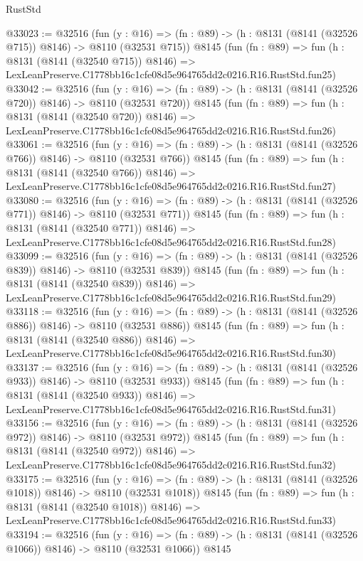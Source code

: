 \begin{lexlean}{RustStd}
\begin{coremodule}
@33023 := @32516
    (fun (y : @16) => (fn : @89) -> (h : @8131 (@8141 (@32526 @715)) @8146) -> @8110 (@32531 @715))
    @8145
    (fun (fn : @89) =>
    fun (h : @8131 (@8141 (@32540 @715)) @8146) =>
    LexLeanPreserve.C1778bb16c1cfe08d5e964765dd2c0216.R16.RustStd.fun25)
@33042 := @32516
    (fun (y : @16) => (fn : @89) -> (h : @8131 (@8141 (@32526 @720)) @8146) -> @8110 (@32531 @720))
    @8145
    (fun (fn : @89) =>
    fun (h : @8131 (@8141 (@32540 @720)) @8146) =>
    LexLeanPreserve.C1778bb16c1cfe08d5e964765dd2c0216.R16.RustStd.fun26)
@33061 := @32516
    (fun (y : @16) => (fn : @89) -> (h : @8131 (@8141 (@32526 @766)) @8146) -> @8110 (@32531 @766))
    @8145
    (fun (fn : @89) =>
    fun (h : @8131 (@8141 (@32540 @766)) @8146) =>
    LexLeanPreserve.C1778bb16c1cfe08d5e964765dd2c0216.R16.RustStd.fun27)
@33080 := @32516
    (fun (y : @16) => (fn : @89) -> (h : @8131 (@8141 (@32526 @771)) @8146) -> @8110 (@32531 @771))
    @8145
    (fun (fn : @89) =>
    fun (h : @8131 (@8141 (@32540 @771)) @8146) =>
    LexLeanPreserve.C1778bb16c1cfe08d5e964765dd2c0216.R16.RustStd.fun28)
@33099 := @32516
    (fun (y : @16) => (fn : @89) -> (h : @8131 (@8141 (@32526 @839)) @8146) -> @8110 (@32531 @839))
    @8145
    (fun (fn : @89) =>
    fun (h : @8131 (@8141 (@32540 @839)) @8146) =>
    LexLeanPreserve.C1778bb16c1cfe08d5e964765dd2c0216.R16.RustStd.fun29)
@33118 := @32516
    (fun (y : @16) => (fn : @89) -> (h : @8131 (@8141 (@32526 @886)) @8146) -> @8110 (@32531 @886))
    @8145
    (fun (fn : @89) =>
    fun (h : @8131 (@8141 (@32540 @886)) @8146) =>
    LexLeanPreserve.C1778bb16c1cfe08d5e964765dd2c0216.R16.RustStd.fun30)
@33137 := @32516
    (fun (y : @16) => (fn : @89) -> (h : @8131 (@8141 (@32526 @933)) @8146) -> @8110 (@32531 @933))
    @8145
    (fun (fn : @89) =>
    fun (h : @8131 (@8141 (@32540 @933)) @8146) =>
    LexLeanPreserve.C1778bb16c1cfe08d5e964765dd2c0216.R16.RustStd.fun31)
@33156 := @32516
    (fun (y : @16) => (fn : @89) -> (h : @8131 (@8141 (@32526 @972)) @8146) -> @8110 (@32531 @972))
    @8145
    (fun (fn : @89) =>
    fun (h : @8131 (@8141 (@32540 @972)) @8146) =>
    LexLeanPreserve.C1778bb16c1cfe08d5e964765dd2c0216.R16.RustStd.fun32)
@33175 := @32516
    (fun (y : @16) =>
    (fn : @89) -> (h : @8131 (@8141 (@32526 @1018)) @8146) -> @8110 (@32531 @1018))
    @8145
    (fun (fn : @89) =>
    fun (h : @8131 (@8141 (@32540 @1018)) @8146) =>
    LexLeanPreserve.C1778bb16c1cfe08d5e964765dd2c0216.R16.RustStd.fun33)
@33194 := @32516
    (fun (y : @16) =>
    (fn : @89) -> (h : @8131 (@8141 (@32526 @1066)) @8146) -> @8110 (@32531 @1066))
    @8145

\end{coremodule}
\end{lexlean}
